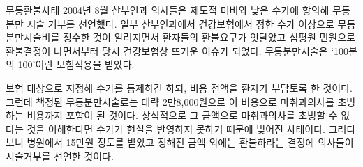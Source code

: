 \par
\medskip
\begin{commentbox}{무통환불사태}
2004년 8월 산부인과 의사들은 제도적 미비와 낮은 수가에 항의해 무통분만 시술 거부를 선언했다. 일부 산부인과에서 건강보험에서 정한 수가 이상으로 무통분만시술비를 징수한 것이 알려지면서 환자들의 환불요구가 잇달았고 심평원 민원으로 환불결정이 나면서부터 당시 건강보험상 뜨거운 이슈가 되었다. 무통분만시술은 ‘100분의 100’이란 보험적용을 받았다.\par
\medskip

보험 대상으로 지정해 수가를 통제하긴 하되, 비용 전액을 환자가 부담토록 한 것이다. 그런데 책정된 무통분만시술료는 대략 2만8,000원으로 이 비용으로 마취과의사를 초빙하는 비용까지 포함이 된 것이다. 상식적으로 그 금액으로 마취과의사를 초빙할 수 없다는 것을 이해한다면 수가가 현실을 반영하지 못하기 때문에 빚어진 사태이다. 그러다보니 병원에서 15만원 정도를 받았고 정해진 금액 외에는 환불하라는 결정에 의사들이 시술거부를 선언한 것이다.
\end{commentbox}

\par
\medskip
\prezi{\clearpage}

